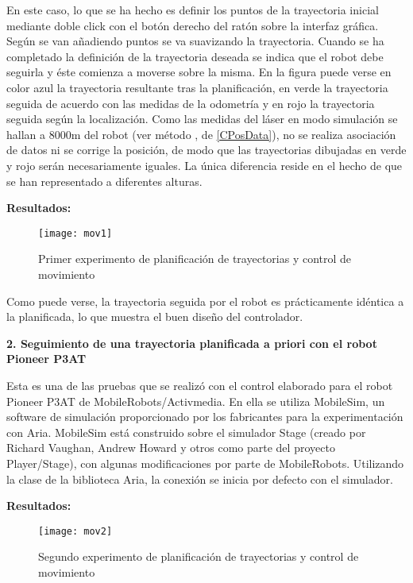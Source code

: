 En este caso, lo que se ha hecho es definir los puntos de la trayectoria inicial mediante doble click con el botón derecho del ratón sobre la interfaz gráfica. Según se van añadiendo puntos se va suavizando la trayectoria. Cuando se ha completado la definición de la trayectoria deseada se indica que el robot debe seguirla y éste comienza a moverse sobre la misma. En la figura puede verse en color azul la trayectoria resultante tras la planificación, en verde la trayectoria seguida de acuerdo con las medidas de la odometría y en rojo la trayectoria seguida según la localización. Como las medidas del láser en modo simulación se hallan a 8000m del robot (ver método , de \ref{CPosData}), no se realiza asociación de datos ni se corrige la posición, de modo que las trayectorias dibujadas en verde y rojo serán necesariamente iguales. La única diferencia reside en el hecho de que se han representado a diferentes alturas.


\textbf{Resultados:}
\begin{figure}[h]
  \centering\texttt{[image: mov1]}\\
  \caption{Primer experimento de planificación de trayectorias y control de movimiento}\label{fg:mov1}
\end{figure}

Como puede verse, la trayectoria seguida por el robot es prácticamente idéntica a la planificada, lo que muestra el buen diseño del controlador.

\noindent
\textbf{\textbf{2.} Seguimiento de una trayectoria planificada a priori con el robot Pioneer P3AT}

Esta es una de las pruebas que se realizó con el control elaborado para el robot Pioneer P3AT de MobileRobots/Activmedia. En ella se utiliza MobileSim, un software de simulación proporcionado por los fabricantes para la experimentación con Aria. MobileSim está construido sobre el simulador Stage (creado por Richard Vaughan, Andrew Howard y otros como parte del proyecto Player/Stage), con algunas modificaciones por parte de MobileRobots. Utilizando la clase  de la biblioteca Aria, la conexión se inicia por defecto con el simulador.


\textbf{Resultados:}
\begin{figure}[h]
  \centering\texttt{[image: mov2]}\\
  \caption{Segundo experimento de planificación de trayectorias y control de movimiento}\label{fg:mov2}
\end{figure}

